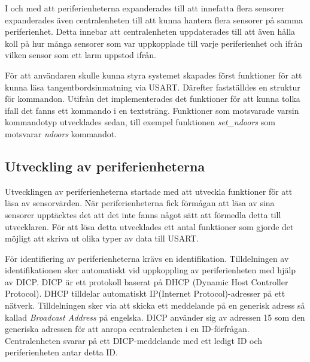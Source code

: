 \documentclass[a4paper]{article}
\newcommand{\todo}[1]{\marginpar{TODO: #1}\vspace{1cm}}
\begin{document}
I och med att periferienheterna expanderades till att innefatta flera sensorer expanderades även centralenheten till att kunna hantera flera sensorer på samma periferienhet. Detta innebar att centralenheten uppdaterades till att även hålla koll på hur många sensorer som var uppkopplade till varje periferienhet och ifrån vilken sensor som ett larm uppstod ifrån.

För att användaren skulle kunna styra systemet skapades först funktioner för att kunna läsa tangentbordsinmatning via USART. Därefter fastställdes en struktur för kommandon. Utifrån det implementerades det funktioner för att kunna tolka ifall det fanns ett kommando i en textsträng. Funktioner som motsvarade varsin kommandotyp utvecklades sedan, till exempel funktionen \textit{set\_ndoors} som motsvarar \textit{ndoors} kommandot. 



\todo{Varför valt 15}
\subsection{Utveckling av periferienheterna}
Utvecklingen av periferienheterna startade med att utveckla funktioner för att läsa av sensorvärden.
När periferienheterna fick förmågan att läsa av sina sensorer upptäcktes det att det inte fanns något sätt att förmedla detta till utvecklaren.
För att lösa detta utvecklades ett antal funktioner som gjorde det möjligt att skriva ut olika typer av data till USART.

För identifiering av periferienheterna krävs en identifikation.
Tilldelningen av identifikationen sker automatiskt vid uppkoppling av periferienheten med hjälp av DICP.
DICP är ett protokoll baserat på DHCP (Dynamic Host Controller Protocol).
DHCP tilldelar automatiskt IP(Internet Protocol)-adresser på ett nätverk.
Tilldelningen sker via att skicka ett meddelande på en generisk adress så kallad \textit{Broadcast Address} på engelska.
DICP använder sig av adressen 15 som den generiska adressen för att anropa centralenheten i en ID-förfrågan.
Centralenheten svarar på ett DICP-meddelande med ett ledigt ID och periferienheten antar detta ID.
\end{document}
